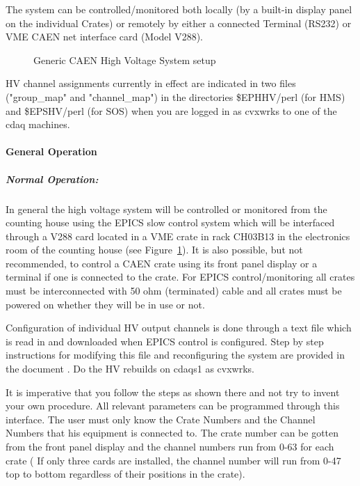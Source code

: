 The system can be controlled/monitored both locally (by a built-in
display panel on the individual Crates) or remotely by either a
connected Terminal (RS232) or VME CAEN net interface card (Model V288).


\begin{figure}
\caption{Generic CAEN High Voltage System setup\label{fig:caen_setup}}
\end{figure}

HV channel assignments currently in effect are indicated in 
two files ("group\_map" and
"channel\_map") in the directories \$EPHHV/perl (for HMS) and \$EPSHV/perl (for
SOS) when you are logged in as cvxwrks to one of the cdaq machines.

\paragraph{General Operation}

\subparagraph{Normal Operation:}

In general the high voltage system will be controlled or monitored
from the counting house using the EPICS slow control system which will
be interfaced through a V288 card located in a VME crate in rack CH03B13
in the electronics room of the counting house
(see Figure~\ref{fig:caen_setup}).  It is also possible, but not recommended,
to control a CAEN crate using its front panel display or a terminal
if one is connected to the crate.
For EPICS control/monitoring all crates must be interconnected with 50
ohm (terminated) cable and all crates must be powered on whether they
will be in use or not.

Configuration of individual HV output channels is done through a
text file which is read in and downloaded when EPICS control is
configured. Step by step instructions for modifying this file and
reconfiguring the system are provided in the document
. Do the HV rebuilds on cdaqs1 as cvxwrks.


It is imperative that
you follow the steps as shown there and not try to invent your own
procedure.
All relevant parameters
can be programmed through this interface.  The user must only know the
Crate Numbers and the Channel Numbers that his equipment is connected
to.  The crate number can be gotten from the front panel display and the
channel numbers run from 0-63 for each crate ( If only three cards are
installed, the channel number will run from 0-47 top to bottom
regardless of their positions in the crate).

